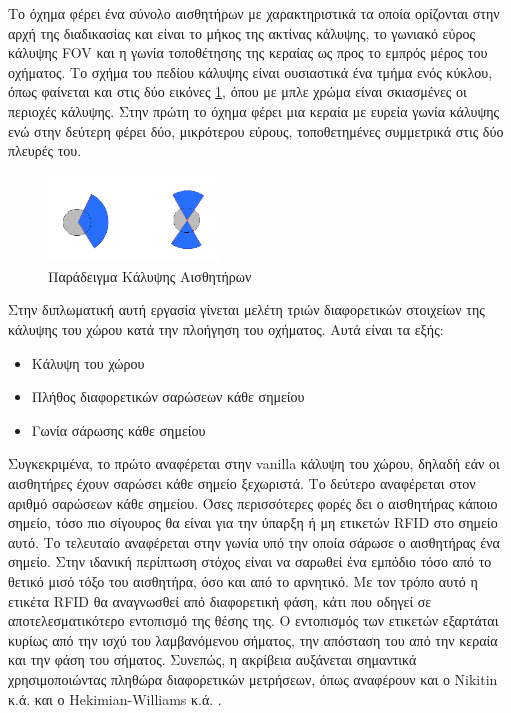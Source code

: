 Το όχημα φέρει ένα σύνολο αισθητήρων με χαρακτηριστικά τα οποία ορίζονται στην αρχή της διαδικασίας και είναι το μήκος της ακτίνας κάλυψης, το γωνιακό εύρος κάλυψης FOV και η γωνία τοποθέτησης της κεραίας ως προς το εμπρός μέρος του οχήματος. Το σχήμα του πεδίου κάλυψης είναι ουσιαστικά ένα τμήμα ενός κύκλου, όπως φαίνεται και στις δύο εικόνες \ref{fig:sensor_field_example}, όπου με μπλε χρώμα είναι σκιασμένες οι περιοχές κάλυψης. Στην πρώτη το όχημα φέρει μια κεραία με ευρεία γωνία κάλυψης ενώ στην δεύτερη φέρει δύο, μικρότερου εύρους, τοποθετημένες συμμετρικά στις δύο πλευρές του.

\begin{figure}[!htb]
    \centering
    \includegraphics[width=0.4\textwidth]{./images/chapter5/sensor_field_example.png}
    \caption{Παράδειγμα Κάλυψης Αισθητήρων}
    \label{fig:sensor_field_example}
\end{figure}

Στην διπλωματική αυτή εργασία γίνεται μελέτη τριών διαφορετικών στοιχείων της κάλυψης του χώρου κατά την πλοήγηση του οχήματος. Αυτά είναι τα εξής:
\begin{itemize}
    \setlength\itemsep{-0.2em}
    \item Κάλυψη του χώρου 
    \item Πλήθος διαφορετικών σαρώσεων κάθε σημείου
    \item Γωνία σάρωσης κάθε σημείου
\end{itemize}
Συγκεκριμένα, το πρώτο αναφέρεται στην vanilla κάλυψη του χώρου, δηλαδή εάν οι αισθητήρες έχουν σαρώσει κάθε σημείο ξεχωριστά. Το δεύτερο αναφέρεται στον αριθμό σαρώσεων κάθε σημείου. Όσες περισσότερες φορές δει ο αισθητήρας κάποιο σημείο, τόσο πιο σίγουρος θα είναι για την ύπαρξη ή μη ετικετών RFID στο σημείο αυτό. Το τελευταίο αναφέρεται στην γωνία υπό την οποία σάρωσε ο αισθητήρας ένα σημείο. Στην ιδανική περίπτωση στόχος είναι να σαρωθεί ένα εμπόδιο τόσο από το θετικό μισό τόξο του αισθητήρα, όσο και από το αρνητικό. Με τον τρόπο αυτό η ετικέτα RFID θα αναγνωσθεί από διαφορετική φάση, κάτι που οδηγεί σε αποτελεσματικότερο εντοπισμό της θέσης της. Ο εντοπισμός των ετικετών εξαρτάται κυρίως από την ισχύ του λαμβανόμενου σήματος, την απόσταση του από την κεραία και την φάση του σήματος. Συνεπώς, η ακρίβεια αυξάνεται σημαντικά χρησιμοποιώντας πληθώρα διαφορετικών μετρήσεων, όπως αναφέρουν και ο Nikitin κ.ά. \cite{rfidNikitin} και ο Hekimian-Williams κ.ά. \cite{rfidHekimian}.

